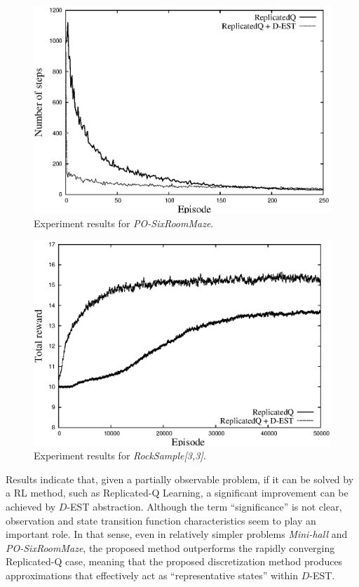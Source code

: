 \documentclass[10pt, conference, compsocconf]{IEEEtran}
\begin{document}
\begin{figure}[t]
\centering
\includegraphics[width=\columnwidth]{results-room-maze}
\caption{Experiment results for \textit{PO-SixRoomMaze}.}
\label{fig:room-maze}
\end{figure}


\begin{figure}[t]
\centering
\includegraphics[width=\columnwidth]{results-rock-sample3x3}
\caption{Experiment results for \textit{RockSample[3,3]}.}
\label{fig:rock-sample}
\end{figure}

Results indicate that, given a partially observable problem, if it can be solved by a RL method, such as Replicated-Q Learning, a significant improvement can be achieved by $D$-EST abstraction. Although the term ``significance'' is not clear, observation and state transition function characteristics seem to play an important role. In that sense, even in relatively simpler problems \textit{Mini-hall} and \textit{PO-SixRoomMaze}, the proposed method outperforms the rapidly converging Replicated-Q case, meaning that the proposed discretization method produces approximations that effectively act as ``representative states'' within $D$-EST.
\end{document}
